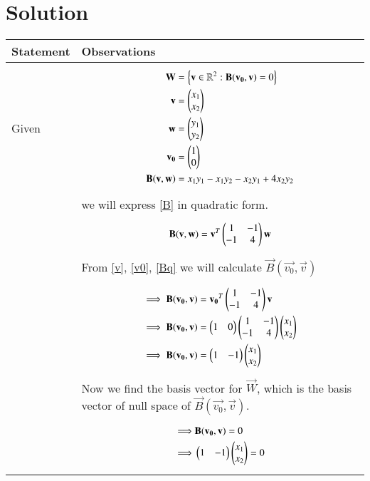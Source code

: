 \documentclass[journal,12pt]{IEEEtran}
\begin{document}
\section{\textbf{Solution}}
\renewcommand{\thetable}{2}
\begin{longtable}{|l|l|}
\hline
\endhead
\textbf{Statement}&\textbf{Observations}\\
\hline
Given&\parbox{15cm}{\begin{align}
    \mathbf{W}&=\left\{\mathbf{v}\in\mathbb{R}^2:\mathbf{B}(\mathbf{v_0},\mathbf{v})=0\right\}\label{W}\\
    \mathbf{v}&=\begin{pmatrix}x_1\\x_2\end{pmatrix}\label{v}\\
    \mathbf{w}&=\begin{pmatrix}y_1\\y_2\end{pmatrix}\label{w}\\
    \mathbf{v_0}&=\begin{pmatrix}1\\0\end{pmatrix}\label{v0}\\
    \mathbf{B}(\mathbf{v},\mathbf{w})&=x_1y_1-x_1y_2-x_2y_1+4x_2y_2\label{B}
\end{align}}\\&we will express \eqref{B} in quadratic form.\\&\parbox{15cm}{\begin{align}
    \mathbf{B}(\mathbf{v},\mathbf{w})=\mathbf{v}^T\begin{pmatrix}1&-1\\-1&4\end{pmatrix}\mathbf{w}\label{Bq}
\end{align}}\\&From \eqref{v}, \eqref{v0}, \eqref{Bq} we will calculate $\vec{B}(\vec{v_0},\vec{v})$\\&\parbox{15cm}{\begin{align}
    \implies\mathbf{B}(\mathbf{v_0},\mathbf{v})&=\mathbf{v_0}^T\begin{pmatrix}1&-1\\-1&4\end{pmatrix}\mathbf{v}\\
    \implies\mathbf{B}(\mathbf{v_0},\mathbf{v})&=\begin{pmatrix}1&0\end{pmatrix}\begin{pmatrix}1&-1\\-1&4\end{pmatrix}\begin{pmatrix}x_1\\x_2\end{pmatrix}\\
    \implies\mathbf{B}(\mathbf{v_0},\mathbf{v})&=\begin{pmatrix}1&-1\end{pmatrix}\begin{pmatrix}x_1\\x_2\end{pmatrix}\label{Bv0}
\end{align}}\\&Now we find the basis vector for $\vec{W}$, which is the basis vector of null space of $\vec{B}(\vec{v_0},\vec{v})$.\\&\parbox{15cm}{\begin{align}
    \implies&\vec{B}(\vec{v_0},\vec{v})=0\\
    \implies&\myvec{1&-1}\myvec{x_1\\x_2}=0\\

\end{align}}
\end{longtable}
\end{document}
